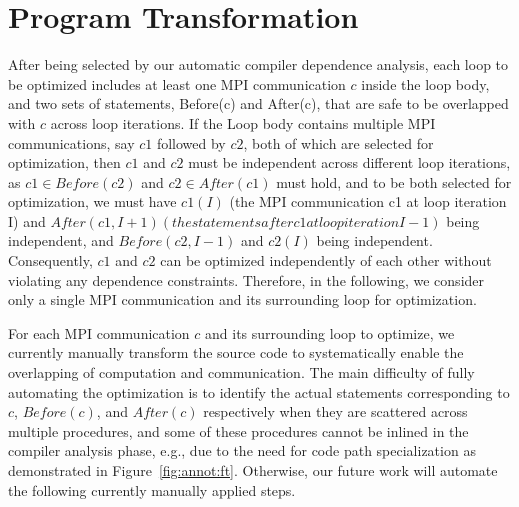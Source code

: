 \section{Program Transformation}
\label{sec-opt}

After being selected by our automatic compiler dependence analysis, each loop 
to be optimized includes at least one MPI communication $c$ inside the loop body, and two sets of statements, 
Before(c) and After(c), that are safe to be overlapped with $c$ across loop iterations. If the Loop body contains 
multiple MPI communications, say $c1$ followed by $c2$, both of which are selected for optimization, then $c1$ and $c2$
must be independent across different loop iterations, as $c1 \in Before(c2)$ and $c2 \in After(c1)$ must hold, and to be
both selected  for optimization, we must have $c1(I)$ (the MPI communication c1 at loop iteration I) and $After(c1,I+1) (the statements after c1 at loop iteration I-1)$ being independent, and $Before(c2,I-1)$ and $c2(I)$ being independent. 
Consequently, $c1$ and $c2$ can be optimized independently of each other without violating any dependence constraints. Therefore, in the following, we consider only a single MPI communication and its surrounding loop for optimization. 

For each MPI communication $c$ and its surrounding loop to optimize, we currently manually
transform the source code to systematically enable the overlapping of
computation and communication. The main difficulty of fully automating the optimization is to identify the 
actual statements corresponding to $c$, $Before(c)$, and $After(c)$ respectively when they are scattered across
multiple procedures,  and some of these procedures cannot be inlined in the compiler analysis phase, e.g., due to 
the need for code path specialization as demonstrated in Figure~\ref{fig:annot:ft}. 
Otherwise, our future work will automate the following currently manually applied steps. 


